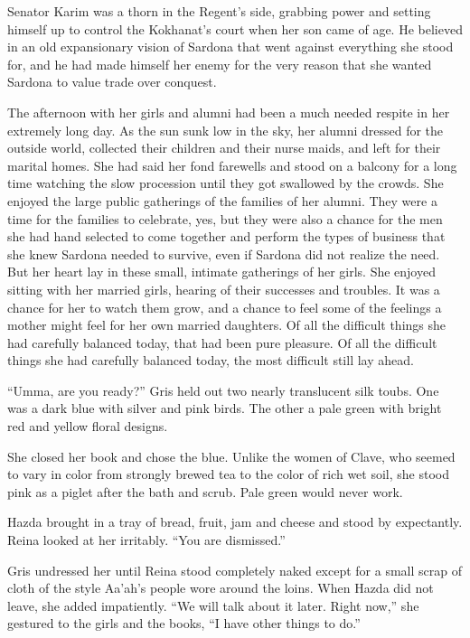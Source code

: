 \documentclass{article}
\begin{document}
	Senator Karim was a thorn in the Regent’s side, grabbing power and setting himself up to control the Kokhanat’s court when her son came of age. He believed in an old expansionary vision of Sardona that went against everything she stood for, and he had made himself her enemy for the very reason that she wanted Sardona to value trade over conquest. 
	
	The afternoon with her girls and alumni had been a much needed respite in her extremely long day. As the sun sunk low in the sky, her alumni dressed for the outside world, collected their children and their nurse maids, and left for their marital homes. She had said her fond farewells and stood on a balcony for a long time watching the slow procession until they got swallowed by the crowds. She enjoyed the large public gatherings of the families of her alumni. They were a time for the families to celebrate, yes, but they were also a chance for the men she had hand selected to come together and perform the types of business that she knew Sardona needed to survive, even if Sardona did not realize the need. But her heart lay in these small, intimate gatherings of her girls. She enjoyed sitting with her married girls, hearing of their successes and troubles. It was a chance for her to watch them grow, and a chance to feel some of the feelings a mother might feel for her own married daughters. Of all the difficult things she had carefully balanced today, that had been pure pleasure. Of all the difficult things she had carefully balanced today, the most difficult still lay ahead. 
	
	“Umma, are you ready?” Gris held out two nearly translucent silk toubs. One was a dark blue with silver and pink birds. The other a pale green with bright red and yellow floral designs.
	
	She closed her book and chose the blue. Unlike the women of Clave, who seemed to vary in color from strongly brewed tea to the color of rich wet soil, she stood pink as a piglet after the bath and scrub. Pale green would never work. 
	
	Hazda brought in a tray of bread, fruit, jam and cheese and stood by expectantly. Reina looked at her irritably. “You are dismissed.” 
	
	
	Gris undressed her until Reina stood completely naked except for a small scrap of cloth of the style Aa’ah’s people wore around the loins. When Hazda did not leave, she added impatiently. “We will talk about it later. Right now,” she gestured to the girls and the books, “I have other things to do.” 
	
\end{document}

